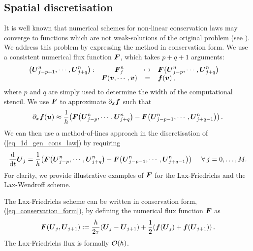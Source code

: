 \documentclass[final]{amsart}
\renewcommand{\dfunkmapstonumflux}[5]{\ensuremath{
		\begin{array}{rccl}
			{#1}: & {#2} &\mapsto&{#3}
			\\
			& {#4} &=&{#5}
		\end{array}\quad}}
\renewcommand{\vect}[1]{\geovec{#1}}
\renewcommand{\vec}[1]{\geovec{#1}}
\numberwithin{equation}{section}
\begin{document}
\subsection{Spatial discretisation}
It is well known that numerical schemes for
non-linear conservation laws may converge to functions which are not weak-solutions of the original problem (see \cite[\S12.1]{leveque1992numerical}). We address this problem by expressing the method in conservation form. We use a consistent numerical flux
function $\vec{F}$, which takes $p+q+1$ arguments:
\begin{equation}\label{eq_defn_num_flux}
\dfunkmapstonumflux{\qp{\vec{U}^n_{j-p+1},\cdots,\vec{U}^n_{j+q}}}{\vec{F}^n_j}{{\vec{F}}\qp{\vec{U}^n_{j-p},\cdots,\vec{U}^n_{j+q}}}{\vec{F}\qp{\vec{v},\cdots,\vec{v}}}{\vec{f}\qp{\vec{v}}, }
\end{equation}
where $p$ and $q$ are simply used to determine the width of the
computational stencil.  We use $\vec{F}$ to approximate
$\partial_{x}\vec{f}$ such that
\begin{equation}\label{eq_num_approx_f}
  \partial_{x}\vec{f}\qp{\vec{u}}\approx \frac{1}{h}\qp{{\vec{F}\qp{\vec{U}^n_{j-p},\cdots,\vec{U}^n_{j+q}}}-{\vec{F}\qp{\vec{U}^n_{j-p-1},\cdots,\vec{U}^n_{j+q-1}}}}.
\end{equation}
We can then use a method-of-lines approach in the discretisation of
(\ref{eq_1d_gen_cons_law}) by requiring
\begin{equation}\label{eq_conservation_form}
\frac{\mathrm{d}}{\mathrm{d}t}\vec{U}_j =  \frac{1}{h}\qp{{\vec{F}\qp{\vec{U}^n_{j-p},\cdots,\vec{U}^n_{j+q}}}-{\vec{F}\qp{\vec{U}^n_{j-p-1},\cdots,\vec{U}^n_{j+q-1}}}} \Foreach j=0, \dots, M.
\end{equation}
For clarity, we provide illustrative examples of $\vec{F}$ for the
Lax-Friedrichs and the Lax-Wendroff scheme. 

\begin{Rem}
  The Lax-Friedrichs scheme can be written in conservation form,
  (\ref{eq_conservation_form}), by defining the numerical flux
  function $\vec{F}$ as
  \begin{equation}\label{eq_F_LxF_cons}
     \vect F\qp{ \vect U_j,  \vect U_{j+1}}
    :=
    \frac{h}{2\tau}\qp{ \vec U_j- \vec U_{j+1}}
    +
    \frac{1}{2}\qp{ \vec f\qp{ \vec U_j}+ \vec f\qp{\vect U_{j+1}}}.
  \end{equation}
  The Lax-Friedrichs flux is formally $\mathcal{O}\!\left({h}\right)$.
\end{Rem}
\end{document}
